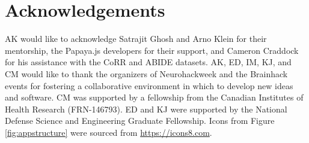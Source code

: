 \section{Acknowledgements}
AK would like to acknowledge Satrajit Ghosh and Arno Klein for their mentorship, the Papaya.js developers for their support, and Cameron Craddock for his assistance with the CoRR and ABIDE datasets. AK, ED, IM, KJ, and CM would like to thank the organizers of Neurohackweek and the Brainhack events for fostering a collaborative environment in which to develop new ideas and software. CM was supported by a fellowship from the Canadian Institutes of Health Research (FRN-146793).  ED and KJ were supported by the National Defense Science and Engineering Graduate Fellowship. Icons from Figure \ref{fig:appstructure} were sourced from \href{https://icons8.com}{https://icons8.com}.

